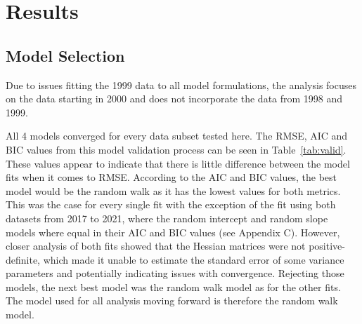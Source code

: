 \documentclass[12pt]{article}\usepackage[]{graphicx}\usepackage[]{color}
\begin{document}
\hypertarget{results}{%
\section{Results}\label{results}}

\hypertarget{model-selection}{%
\subsection{Model Selection}\label{model-selection}}

Due to issues fitting the 1999 data to all model formulations, the analysis focuses on the data starting in 2000 and does not incorporate the data from 1998 and 1999.

All 4 models converged for every data subset tested here. The RMSE, AIC and BIC values from this model validation process can be seen in Table~\ref{tab:valid}. These values appear to indicate that there is little difference between the model fits when it comes to RMSE. According to the AIC and BIC values, the best model would be the random walk as it has the lowest values for both metrics. This was the case for every single fit with the exception of the fit using both datasets from 2017 to 2021, where the random intercept and random slope models where equal in their AIC and BIC values (see Appendix C). However, closer analysis of both fits showed that the Hessian matrices were not positive-definite, which made it unable to estimate the standard error of some variance parameters and potentially indicating issues with convergence. Rejecting those models, the next best model was the random walk model as for the other fits. The model used for all analysis moving forward is therefore the random walk model.
\end{document}
